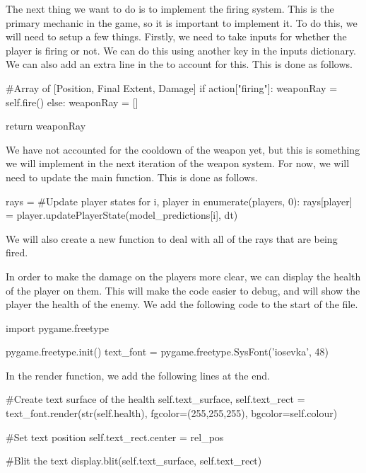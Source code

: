 The next thing we want to do is to implement the firing system. This is the primary mechanic in the game, so it is important to implement it. To do this, we will need to setup a few things. Firstly, we need to take inputs for whether the player is firing or not. We can do this using another key in the inputs dictionary. We can also add an extra line in the  to account for this. This is done as follows.
\begin{mpy}
        #Array of [Position, Final Extent, Damage]
        if action["firing"]:
            weaponRay = self.fire()
        else:
            weaponRay = []

        return weaponRay
\end{mpy}

We have not accounted for the cooldown of the weapon yet, but this is something we will implement in the next iteration of the weapon system. For now, we will need to update the main  function. This is done as follows.

\begin{mpy}
            rays = {}
            #Update player states
            for i, player in enumerate(players, 0):
                rays[player] = player.updatePlayerState(model_predictions[i], dt)
\end{mpy}

We will also create a new function  to deal with all of the rays that are being fired.

\begin{mpy}

\end{mpy}

In order to make the damage on the players more clear, we can display the health of the player on them. This will make the code easier to debug, and will show the player the health of the enemy. We add the following code to the start of the  file.

\begin{mpy}
import pygame.freetype

pygame.freetype.init()
text_font = pygame.freetype.SysFont('iosevka', 48)
\end{mpy}

In the render function, we add the following lines at the end.

\begin{mpy}
                #Create text surface of the health
                self.text_surface, self.text_rect = text_font.render(str(self.health), fgcolor=(255,255,255), bgcolor=self.colour)

                #Set text position
                self.text_rect.center = rel_pos

                #Blit the text
                display.blit(self.text_surface, self.text_rect)
\end{mpy}

